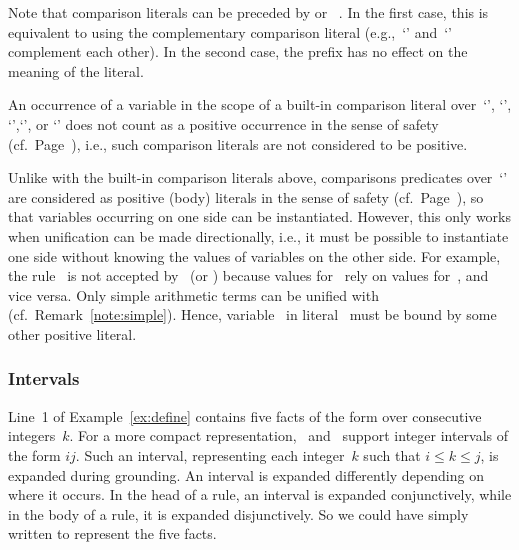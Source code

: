 \begin{note}
Note that comparison literals can be preceded by  or ~.
In the first case, this is equivalent to using the complementary comparison literal
(e.g.,~`\code{<}' and~`\code{>=}' complement each other).
In the second case, the prefix has no effect on the meaning of the literal.

An occurrence of a variable in the scope of a built-in comparison literal over~`\code{!=}', `\code{<}', `\code{<=}',`\code{>}', or `\code{>=}'
does not count as a positive occurrence in the sense of safety (cf.\ Page~\pageref{pg:safe}),
i.e.,
such comparison literals are not considered to be positive.

Unlike with the built-in comparison literals above,
comparisons predicates over~`\code{=}' are considered as positive (body) literals in the sense of safety (cf.\ Page~\pageref{pg:safe}),
so that variables occurring on one side can be instantiated.
However, this only works when unification can be made directionally,
i.e., it must be possible to instantiate one side without knowing the values of variables on the other side.
For example, the rule~
is not accepted by \gringo\ (or \clingo)
because values for~ rely on values for~, and vice versa.
Only simple arithmetic terms can be unified with (cf.\ Remark~\ref{note:simple}).
Hence, variable~ in literal~ must be bound by some other positive literal.
%
%
\end{note}

\subsubsection{Intervals}\label{subsec:gringo:interval}

Line~1 of Example~\ref{ex:define} contains
five facts of the form 
over consecutive integers~$k$.
For a more compact representation,
\gringo\ and \clingo\ support integer intervals of the form $i$$j$.
Such an interval, representing each integer~$k$ such that $i\leq k\leq j$,
is expanded during grounding.
An interval is expanded differently depending on where it occurs.
In the head of a rule, an interval is expanded conjunctively,
while in the body of a rule, it is expanded disjunctively.
So we could have simply written  to represent the five facts.

